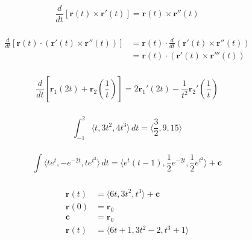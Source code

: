 \documentclass{article}
\begin{document}
\[\frac{d}{d t} [\mathbf{r}(t) \times \mathbf{r}'(t)] = \mathbf{r}(t) \times \mathbf{r}''(t)\]

\setcounter{subsubsection}{28}
\subsubsection{}

\begin{align*}
  \frac{d}{d t} [\mathbf{r}(t) \cdot (\mathbf{r}'(t) \times \mathbf{r}''(t))] & = \mathbf{r}(t) \cdot \frac{d}{d t} (\mathbf{r}'(t) \times \mathbf{r}''(t)) \\
                                                                              & = \mathbf{r}(t) \cdot (\mathbf{r}'(t) \times \mathbf{r}'''(t))
\end{align*}

\setcounter{subsubsection}{30}
\subsubsection{}

\[\frac{d}{d t} \left[ \mathbf{r}_1(2 t) + \mathbf{r}_2 \left( \frac{1}{t} \right) \right] = 2 \mathbf{r}_1'(2 t) - \frac{1}{t^2} \mathbf{r}_2' \left( \frac{1}{t} \right)\]

\setcounter{subsubsection}{32}
\subsubsection{}

\[\int_{-1}^2 \langle t, 3 t^2, 4 t^3 \rangle \,dt = \langle \frac{3}{2}, 9, 15 \rangle\]

\setcounter{subsubsection}{34}
\subsubsection{}

\[\int \langle t e^t, -e^{-2 t}, t e^{t^2} \rangle \,dt = \langle e^t (t - 1), \frac{1}{2} e^{-2 t}, \frac{1}{2} e^{t^2} \rangle + \mathbf{c}\]

\setcounter{subsubsection}{36}
\subsubsection{}

\begin{align*}
  \mathbf{r}(t) & = \langle 6 t, 3 t^2, t^3 \rangle + \mathbf{c} \\
  \mathbf{r}(0) & = \mathbf{r}_0                                 \\
  \mathbf{c}    & = \mathbf{r}_0                                 \\
  \mathbf{r}(t) & = \langle 6 t + 1, 3 t^2 - 2, t^3 + 1 \rangle
\end{align*}
\end{document}
